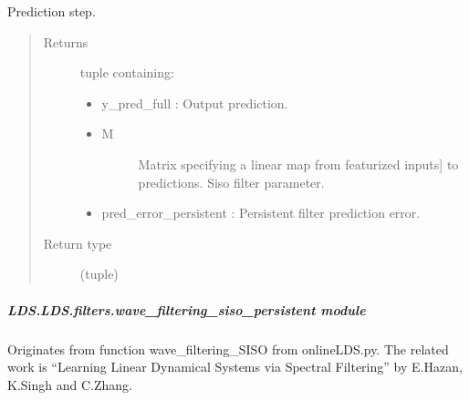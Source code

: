 \documentclass[letterpaper,10pt,english]{sphinxmanual}
\begin{document}
\begin{fulllineitems}
\begin{fulllineitems}
\label{\detokenize{LDS.LDS.filters:LDS.LDS.filters.wave_filtering_siso_ftl_persistent.WaveFilteringSisoFtlPersistent.predict}}
\sphinxAtStartPar
Prediction step.
\begin{quote}\begin{description}
\item[{Returns}] \leavevmode
\sphinxAtStartPar

\sphinxAtStartPar
tuple containing:
\begin{itemize}
\item {} 
\sphinxAtStartPar
y\_pred\_full           : Output prediction.

\item {} \begin{description}
\item[{M}] \leavevmode{[}Matrix specifying a linear map from featurized inputs{]}
\sphinxAtStartPar
to predictions. Siso filter parameter.

\end{description}

\item {} 
\sphinxAtStartPar
pred\_error\_persistent : Persistent filter prediction error.

\end{itemize}


\item[{Return type}] \leavevmode
\sphinxAtStartPar
(tuple)

\end{description}\end{quote}

\end{fulllineitems}


\end{fulllineitems}



\subparagraph{LDS.LDS.filters.wave\_filtering\_siso\_persistent module}
\label{\detokenize{LDS.LDS.filters:module-LDS.LDS.filters.wave_filtering_siso_persistent}}\label{\detokenize{LDS.LDS.filters:lds-lds-filters-wave-filtering-siso-persistent-module}}
\sphinxAtStartPar
Originates from function wave\_filtering\_SISO from onlineLDS.py.
The related work is “Learning Linear Dynamical Systems via Spectral Filtering”
by E.Hazan, K.Singh and C.Zhang.
\end{document}
